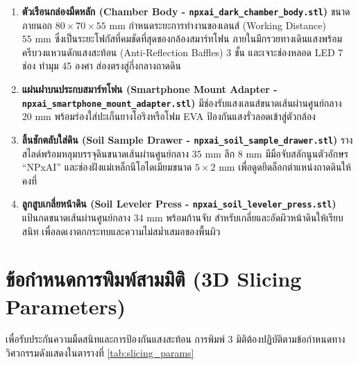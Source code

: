 \documentclass[12pt,a4paper,oneside]{book}
\begin{document}
\begin{enumerate}
    \item \textbf{ตัวเรือนกล่องมืดหลัก (Chamber Body - \texttt{npxai\_dark\_chamber\_body.stl})}
    ขนาดภายนอก $80 \times 70 \times 55\text{ mm}$ กำหนดระยะการทำงานของเลนส์ (Working Distance) $55\text{ mm}$ ซึ่งเป็นระยะโฟกัสที่คมชัดที่สุดของกล้องสมาร์ทโฟน ภายในมีกรวยทางเดินแสงพร้อมครีบวงแหวนดักแสงสะท้อน (Anti-Reflection Baffles) 3 ชั้น และเจาะช่องหลอด LED 7 ช่อง ทำมุม 45 องศา ส่องตรงสู่กึ่งกลางถาดดิน
    
    \item \textbf{แผ่นฝาบนประกบสมาร์ทโฟน (Smartphone Mount Adapter - \texttt{npxai\_smartphone\_mount\_adapter.stl})}
    มีช่องรับแสงเลนส์ขนาดเส้นผ่านศูนย์กลาง $20\text{ mm}$ พร้อมร่องใส่ปะเก็นยางโอริงหรือโฟม EVA ป้องกันแสงรั่วลอดเข้าสู่ตัวกล้อง
    
    \item \textbf{ลิ้นชักตลับใส่ดิน (Soil Sample Drawer - \texttt{npxai\_soil\_sample\_drawer.stl})}
    รางสไลด์พร้อมหลุมบรรจุดินขนาดเส้นผ่านศูนย์กลาง $35\text{ mm}$ ลึก $8\text{ mm}$ มีมือจับสลักนูนตัวอักษร ``NPxAI'' และช่องฝังแม่เหล็กนีโอไดเมียมขนาด $5 \times 2\text{ mm}$ เพื่อดูดยึดล็อกตำแหน่งถาดดินให้คงที่
    
    \item \textbf{ลูกสูบเกลี่ยหน้าดิน (Soil Leveler Press - \texttt{npxai\_soil\_leveler\_press.stl})}
    แป้นกดขนาดเส้นผ่านศูนย์กลาง $34\text{ mm}$ พร้อมก้านจับ สำหรับเกลี่ยและอัดผิวหน้าดินให้เรียบสนิท เพื่อลดเงาตกกระทบและความไม่สม่ำเสมอของพื้นผิว
\end{enumerate}

\section{ข้อกำหนดการพิมพ์สามมิติ (3D Slicing Parameters)}
เพื่อรับประกันความมืดสนิทและการป้องกันแสงสะท้อน การพิมพ์ 3 มิติต้องปฏิบัติตามข้อกำหนดทางวิศวกรรมดังแสดงในตารางที่ \ref{tab:slicing_params}
\end{document}

